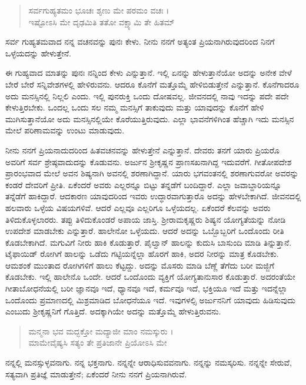 \begin{verse}
ಸರ್ವಗುಹ್ಯತಮಂ ಭೂಚಃ ಶೃಣು ಮೇ ಪರಮಂ ವಚಃ ।\\ಇಷ್ಟೋಽಸಿ ಮೇ ದೃಢಮಿತಿ ತತೋ ವಕ್ಷ್ಯಾಮಿ ತೇ ಹಿತಮ್ 
\end{verse}

{\small ಸರ್ವ ಗುಹ್ಯತಮವಾದ ನನ್ನ ವಚನವನ್ನು ಪುನಃ ಕೇಳು. ನೀನು ನನಗೆ ಅತ್ಯಂತ ಪ್ರಿಯನಾಗಿರುವುದರಿಂದ ನಿನಗೆ ಒಳ್ಳೆಯದನ್ನು ಹೇಳುತ್ತೇನೆ.}

ಈ ಗುಹ್ಯವಾದ ಮಾತನ್ನು ಪುನಃ ನನ್ನಿಂದ ಕೇಳು ಎನ್ನುತ್ತಾನೆ. ಇಲ್ಲಿ ಏನನ್ನು ಹೇಳುತ್ತಾನೆಯೋ ಅದನ್ನು ಅನೇಕ ವೇಳೆ ಬೇರೆ ಬೇರೆ ಸನ್ನಿವೇಶಗಳಲ್ಲಿ ಹೇಳಿರುವನು. ಆದರೂ ಕೊನೆಗೆ ಮತ್ತೊಮ್ಮೆ ಹೇಳಿಬಿಡುತ್ತೇನೆ ಎನ್ನುತ್ತಾನೆ. ಕೊನೆಗಾದರೂ ಅದು ಮನಸ್ಸಿನಲ್ಲಿ ನಿಲ್ಲಲಿ ಎಂದು. ಇಲ್ಲಿ ಪುನರುಕ್ತಿ ಒಂದು ದೋಷವಲ್ಲ. ಜೀವನದಲ್ಲಿ ನಾವು ಇದನ್ನು ಪದೇ ಪದೇ ಕೇಳುತ್ತಿರಬೇಕು. ಒಂದಲ್ಲ ಒಂದು ಸಲ ನಮ್ಮ ಮನಸ್ಸಿಗೆ ತಾಕುವುದು ಮತ್ತು ಯಾವುದನ್ನು ಕೊನೆಗೆ ಹೇಳಿ ಮುಗಿಸುತ್ತಾನೆಯೋ ಅದು ಮನಸ್ಸಿನಲ್ಲಿಯೇ ಕೊರೆಯುತ್ತಿರುವುದು. ಎಲ್ಲಾ ಭಾವನೆಗಳಿಗಿಂತ ಹೆಚ್ಚಾಗಿ ಇದು ಮನಸ್ಸಿನ ಮೇಲೆ ಪರಿಣಾಮವನ್ನು ಉಂಟು ಮಾಡುವುದು.

ನೀನು ನನಗೆ ಪ್ರಿಯನಾದುದರಿಂದ ಹಿತವಚನವನ್ನು ಹೇಳುತ್ತೇನೆ ಎನ್ನುತ್ತಾನೆ. ದೇವರು ತನಗೆ ಯಾರು ಪ್ರಿಯರೊ ಅವರಿಗೆ ಸರ್ವ ಶ್ರೇಷ್ಠವಾದುದನ್ನು ಕೊಡುವನು. ಅರ್ಜುನ ಶ್ರೀಕೃಷ್ಣನ ಪ್ರಾಣಸಖನಾಗಿದ್ದ ಇದುವರೆಗೆ. ಗೀತೋಪದೇಶ ಪ್ರಾರಂಭವಾದ ಮೇಲೆ ಅವನ ಶಿಷ್ಯನಾಗಿ ಅವನಲ್ಲಿ ಶರಣಾಗಿದ್ದಾನೆ. ಯಾರು ಭಗವಂತನಲ್ಲಿ ಶರಣಾಗುವರೋ ಅವರನ್ನು ಕಂಡರೆ ದೇವರಿಗೆ ಪ್ರೀತಿ. ಏಕೆಂದರೆ ಅವರು ಎಲ್ಲರನ್ನೂ ಬಿಟ್ಟು ತನ್ನಡೆಗೆ ಬಂದಿದ್ದಾರೆ. ಎಲ್ಲಾ ಜವಾಬ್ದಾರಿಯನ್ನೂ ತನ್ನೆಡೆಗೆ ಹಾಕಿದ್ದಾರೆ. ಆದಕಾರಣ ಯಾವುದರಿಂದ ಇವರು ಉದ್ಧಾರವಾಗುತ್ತಾರೊ ಅದನ್ನು ಹೇಳಬೇಕಾಗಿದೆ. ಜೀವನದಲ್ಲಿ ಹಲವಾರು ಒಳ್ಳೆಯ ವಿಷಯಗಳಿವೆ. ಆದರೆ ಎಲ್ಲವೂ ಎಲ್ಲರಿಗೂ ಒಳ್ಳೆಯದಲ್ಲ. ಏಕೆಂದರೆ ಕೆಲವನ್ನು ಅವರು ತಿಳಿದುಕೊಳ್ಳಲಾರರು. ತಪ್ಪು ತಿಳಿದುಕೊಂಡರೆ ಅಪಾಯ ಜಾಸ್ತಿ. ಶ್ರೀರಾಮಕೃಷ್ಣರು ಶಿಷ್ಯನ ಯೋಗ್ಯತೆಯನ್ನು ನೋಡಿ ಉಪದೇಶ ಮಾಡಬೇಕು ಎನ್ನುತ್ತಾರೆ. ಹಾಲೇನೋ ಒಳ್ಳೆಯದು. ಆದರೆ ಅದನ್ನು ಒಬ್ಬೊಬ್ಬರಿಗೆ ಒಂದೊಂದು ರೀತಿ ಕೊಡಬೇಕಾಗಿದೆ. ಮಗುವಿಗೆ ನೀರು ಹಾಕಿ ಕೊಡುತ್ತಾರೆ. ಪೈಲ್ವಾನ್ ಹಾಲನ್ನು ಕುದುಸಿ ಬಾಸುಂದಿ ಮಾಡಿ ತಿನ್ನುತ್ತಾನೆ. ಟೈಫಾಯಿಡ್ ರೋಗಿಗೆ ಹಾಲನ್ನು ಒಡೆದು ಗಟ್ಟಿಯನ್ನೆಲ್ಲಾ ಹೊರಗೆ ಹಾಕಿ, ಅದರ ನೀರನ್ನು ಮಾತ್ರ ಕೊಡಬೇಕು. ಆಮಶಂಕೆ ಮುಂತಾದ ರೋಗಿಗಳಿಗೆ ಹಾಲು ಕೆಟ್ಟದ್ದು. ಅದನ್ನು ಮೊಸರು ಮಾಡಿ ಬೆಣ್ಣೆ ತೆಗೆದು ಬರೀ ಮಜ್ಜಿಗೆ ಕೊಡಬೇಕು. ಇಲ್ಲಿ ಹಾಲೇನೊ ಒಂದೇ. ಆದರೆ ಒಂದೊಂದು ವ್ಯಕ್ತಿಗೆ ಯೋಗ್ಯತಾನುಸಾರ ಕೊಡುತ್ತಾರೆ. ಅದರಂತೆಯೇ ಗೀತಾಬೋಧನೆಯಲ್ಲಿ ಬರೀ ಜ್ಞಾನವೂ ಇದೆ, ಧ್ಯಾನವೂ ಇದೆ, ಕರ್ಮವೂ ಇದೆ, ಭಕ್ತಿಯೂ ಇದೆ ಮತ್ತು ಇದನ್ನೆಲ್ಲಾ ಒಂದೊಂದು ಪ್ರಮಾಣದಲ್ಲಿ ಮಿಶ್ರಮಾಡಿದ ಬೋಧನೆಯೂ ಇದೆ. ಇವುಗಳಲ್ಸಿ ಅರ್ಜುನನಿಗೆ ಯಾವುದು ಹಿಡಿಸುವುದು ಎಂಬುದು ಶ್ರೀಕೃಷ್ಣನಿಗೆ ಗೊತ್ತಿದೆ. ಅದಕ್ಕಾಗಿಯೇ ಅದನ್ನು ಮತ್ತೊಮ್ಮೆ ಹೇಳುತ್ತಿರುವನು.

\begin{verse}
ಮನ್ಮನಾ ಭವ ಮದ್ಭಕ್ತೋ ಮದ್ಯಾಜೀ ಮಾಂ ನಮಸ್ಕುರು ।\\ಮಾಮೇವೈಷ್ಯಸಿ ಸತ್ಯಂ ತೇ ಪ್ರತಿಜಾನೇ ಪ್ರಿಯೋಽಸಿ ಮೇ 
\end{verse}

{\small ನನ್ನಲ್ಲಿ ಮನಸ್ಸುಳ್ಳವನಾಗು. ನನ್ನ ಭಕ್ತನಾಗು. ನನ್ನನ್ನೇ ಆರಾಧಿಸುವವನಾಗು. ನನ್ನನ್ನು ನಮಸ್ಕರಿಸು. ನನ್ನನ್ನೇ ಸೇರುವೆ, ಸತ್ಯವಾಗಿ ಪ್ರತಿಜ್ಞೆ ಮಾಡುತ್ತೇನೆ; ಏಕೆಂದರೆ ನೀನು ನನಗೆ ಪ್ರಿಯನಾಗಿರುವೆ.}

